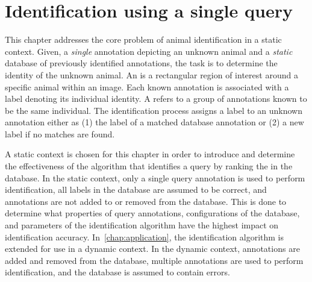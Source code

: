 \begin{comment}
    ./texfix.py --fpaths chapter3-matching.tex --outline --asmarkdown --numlines=999 -w
    ./texfix.py --fpaths chapter3-matching.tex --outline --asmarkdown --numlines=999 -w
    ./texfix.py --fpaths chapter3-matching.tex --reformat 
    # http://jaxedit.com/mark/
\end{comment}



\chapter{Identification using a single query}\label{chap:matching}

    This chapter addresses the core problem of animal identification in
      a static context.
    Given, a \emph{single} annotation depicting an unknown animal and a
      \emph{static} database of previously identified annotations, the
      task is to determine the identity of the unknown animal.
    An  is a rectangular region  of interest
      around a specific animal within an image.
    Each known annotation is associated with a \name{} label denoting
      its individual identity.
    A \glossterm{\name} refers to a group of annotations known to be
      the same individual.
    The identification process assigns a \name{} label to an unknown
      annotation either as
    (1) the \name{} label of a matched database annotation or
    (2) a new \name{} label if no matches are found.

    A static context is chosen for this chapter in order to introduce
      and determine the effectiveness of the algorithm that identifies a
      query by ranking the \names{} in the database.
    In the static context, only a single query annotation is used to
      perform identification, all \name{} labels in the database are
      assumed to be correct, and annotations are not added to or removed
      from the database.
    This is done to determine what properties of query annotations,
      configurations of the database, and parameters of the
      identification algorithm have the highest impact on identification
      accuracy.
    In~\cref{chap:application}, the identification algorithm is
      extended for use in a dynamic context.
    In the dynamic context, annotations are added and removed from the
      database, multiple annotations are used to perform identification,
      and the database is assumed to contain errors.

